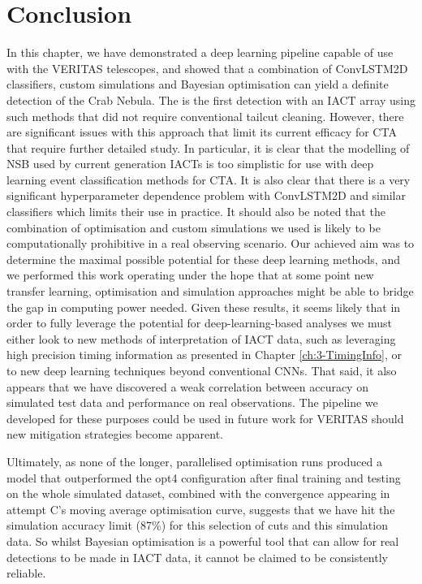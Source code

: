 \section{Conclusion}
In this chapter, we have demonstrated a deep learning pipeline capable of use with the VERITAS telescopes, and showed that a combination of ConvLSTM2D classifiers, custom simulations and Bayesian optimisation can yield a definite detection of the Crab Nebula. The is the first detection with an IACT array using such methods that did not require conventional tailcut cleaning. However, there are significant issues with this approach that limit its current efficacy for CTA that require further detailed study. In particular, it is clear that the modelling of NSB used by current generation IACTs is too simplistic for use with deep learning event classification methods for CTA. It is also clear that there is a very significant hyperparameter dependence problem with ConvLSTM2D and similar classifiers which limits their use in practice. It should also be noted that the combination of optimisation and custom simulations we used is likely to be computationally prohibitive in a real observing scenario. Our achieved aim was to determine the maximal possible potential for these deep learning methods, and we performed this work operating under the hope that at some point new transfer learning, optimisation and simulation approaches might be able to bridge the gap in computing power needed. Given these results, it seems likely that in order to fully leverage the potential for deep-learning-based analyses we must either look to new methods of interpretation of IACT data, such as leveraging high precision timing information as presented in Chapter \ref{ch:3-TimingInfo}, or to new deep learning techniques beyond conventional CNNs. That said, it also appears that we have discovered a weak correlation between accuracy on simulated test data and performance on real observations. The pipeline we developed for these purposes could be used in future work for VERITAS should new mitigation strategies become apparent.

Ultimately, as none of the longer, parallelised optimisation runs produced a model that outperformed the opt4 configuration after final training and testing on the whole simulated dataset, combined with the convergence appearing in attempt C's moving average optimisation curve, suggests that we have hit the simulation accuracy limit (87\%) for this selection of cuts and this simulation data. So whilst Bayesian optimisation is a powerful tool that can allow for real detections to be made in IACT data, it cannot be claimed to be consistently reliable.
